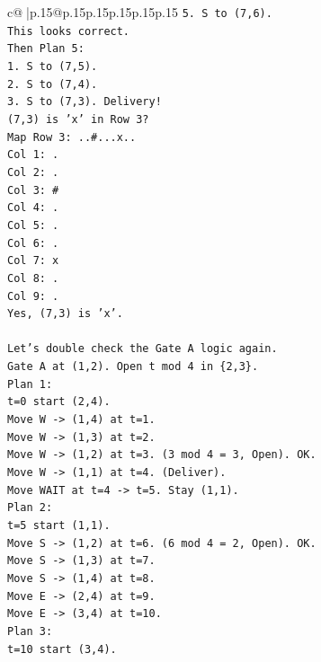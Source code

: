 \documentclass{article}
\begin{document}
{\begin{supertabular}{c@{$\;$}|p{.15\linewidth}@{}p{.15\linewidth}p{.15\linewidth}p{.15\linewidth}p{.15\linewidth}p{.15\linewidth}}
{{{\texttt{5. S to (7,6).} \\
\texttt{This looks correct.} \\
\texttt{Then Plan 5:} \\
\texttt{1. S to (7,5).} \\
\texttt{2. S to (7,4).} \\
\texttt{3. S to (7,3). Delivery!} \\
\texttt{(7,3) is 'x' in Row 3?} \\
\texttt{Map Row 3: ..\#...x..} \\
\texttt{Col 1: .} \\
\texttt{Col 2: .} \\
\texttt{Col 3: \#} \\
\texttt{Col 4: .} \\
\texttt{Col 5: .} \\
\texttt{Col 6: .} \\
\texttt{Col 7: x} \\
\texttt{Col 8: .} \\
\texttt{Col 9: .} \\
\texttt{Yes, (7,3) is 'x'.} \\
\\ 
\texttt{Let's double check the Gate A logic again.} \\
\texttt{Gate A at (1,2). Open t mod 4 in \{2,3\}.} \\
\texttt{Plan 1:} \\
\texttt{t=0 start (2,4).} \\
\texttt{Move W {-}> (1,4) at t=1.} \\
\texttt{Move W {-}> (1,3) at t=2.} \\
\texttt{Move W {-}> (1,2) at t=3. (3 mod 4 = 3, Open). OK.} \\
\texttt{Move W {-}> (1,1) at t=4. (Deliver).} \\
\texttt{Move WAIT at t=4 {-}> t=5. Stay (1,1).} \\
\texttt{Plan 2:} \\
\texttt{t=5 start (1,1).} \\
\texttt{Move S {-}> (1,2) at t=6. (6 mod 4 = 2, Open). OK.} \\
\texttt{Move S {-}> (1,3) at t=7.} \\
\texttt{Move S {-}> (1,4) at t=8.} \\
\texttt{Move E {-}> (2,4) at t=9.} \\
\texttt{Move E {-}> (3,4) at t=10.} \\
\texttt{Plan 3:} \\
\texttt{t=10 start (3,4).} \\
}}}
\end{supertabular}}
\end{document}
